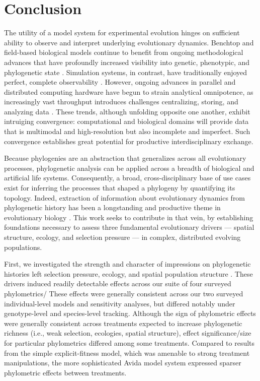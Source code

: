 \section{Conclusion}
\label{sec:conclusion}

The utility of a model system for experimental evolution hinges on sufficient ability to observe and interpret underlying evolutionary dynamics.
Benchtop and field-based biological models continue to benefit from ongoing methodological advances that have profoundly increased visibility into genetic, phenotypic, and phylogenetic state \citep{woodworth2017building,blomberg2011measuring,schneider2019past}.
Simulation systems, in contrast, have traditionally enjoyed perfect, complete observability \citep{hindre2012new}.
However, ongoing advances in parallel and distributed computing hardware have begun to strain analytical omnipotence, as increasingly vast throughput introduces challenges centralizing, storing, and analyzing data \citep{klasky2021data}.
These trends, although unfolding opposite one another, exhibit intruiging convergence: computational and biological domains will provide data that is multimodal and high-resolution but also incomplete and imperfect.
Such convergence establishes great potential for productive interdisciplinary exchange.

Because phylogenies are an abstraction that generalizes across all evolutionary processes, phylogenetic analysis can be applied across a breadth of biological and artificial life systems.
Consequently, a broad, cross-disciplinary base of use cases exist for inferring the processes that shaped a phylogeny by quantifying its topology.
Indeed, extraction of information about evolutionary dynamics from phylogenetic history has been a longstanding and productive theme in evolutionary biology \citep{pagel1997inferring}.
This work seeks to contribute in that vein, by establishing foundations necessary to assess three fundamental evolutionary drivers  --- spatial structure, ecology, and selection pressure ---  in complex, distributed evolving populations.

First, we investigated the strength and character of impressions on phylogenetic histories left selection pressure, ecology, and spatial population structure .
These drivers induced readily detectable effects across our suite of four surveyed phylometrics/
These effects were generally consistent across our two surveyed individual-level models and sensitivity analyses, but differed notably under genotype-level and species-level tracking.
Although the sign of phylometric effects were generally consistent across treatments expected to increase phylogenetic richness (i.e., weak selection, ecologies, spatial structure), effect significance/size for particular phylometrics differed among some treatments.
Compared to results from the simple explicit-fitness model, which was amenable to strong treatment manipulations, the more sophisticated Avida model system expressed sparser phylometric effects between treatments.

